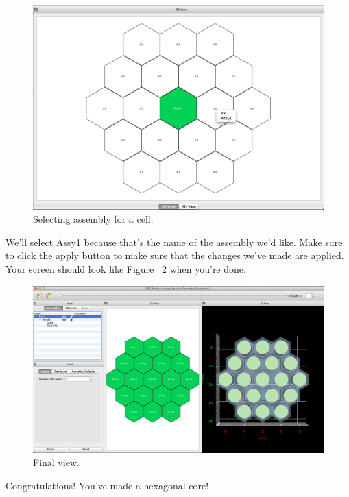 \begin{figure}[H]
	\begin{center}
		\includegraphics[width=0.5\linewidth]{Images/hex-assign-assy.png}
		\caption{Selecting assembly for a cell.}
		\label{fig:Hex19}
	\end{center}
\end{figure}

We'll select Assy1 because that's the name of the assembly we'd like.  Make sure to click the apply button to make sure that the changes we've made are applied.  Your screen should look like Figure  ~\ref{fig:Hex20} when you're done.

\begin{figure}[H]
	\begin{center}
		\includegraphics[width=0.85\linewidth]{Images/hex-final-core.png}
		\caption{Final view.}
		\label{fig:Hex20}
	\end{center}
\end{figure}

Congratulations!  You've made a hexagonal core!